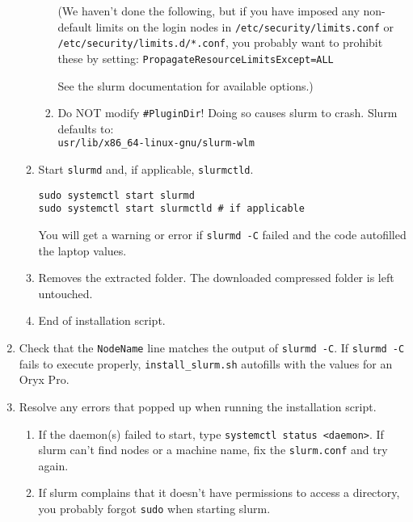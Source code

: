 \begin{enumerate}
\begin{enumerate}
\begin{enumerate}
            (We haven't done the following, but if you have imposed any non-default limits on the login nodes in \texttt{/etc/security/limits.conf} or \texttt{/etc/security/limits.d/*.conf}, you probably want to prohibit these by setting: 
            \texttt{PropagateResourceLimitsExcept=ALL}
	
            See the slurm documentation for available options.)

          \item Do NOT modify \texttt{\#PluginDir}! Doing so causes slurm to crash. Slurm defaults to: \\
            \texttt{usr/lib/x86\_64-linux-gnu/slurm-wlm}
        \end{enumerate} 

      \item Start \texttt{slurmd} and, if applicable, \texttt{slurmctld}.

        \texttt{sudo systemctl start slurmd} \\
        \texttt{sudo systemctl start slurmctld \quad \# if applicable}

        You will get a warning or error if \texttt{slurmd -C} failed and the code autofilled the laptop values.

      \item Removes the extracted folder. The downloaded compressed folder is left untouched.
	
      \item End of installation script.
    \end{enumerate}
	
  \item Check that the \texttt{NodeName} line matches the output of \texttt{slurmd -C}. If \texttt{slurmd -C} fails to execute properly, \texttt{install\_slurm.sh} autofills with the values for an Oryx Pro.

  \item Resolve any errors that popped up when running the installation script.

    \begin{enumerate}
      \item If the daemon(s) failed to start, type \texttt{systemctl status <daemon>}. If slurm can't find nodes or a machine name, fix the \texttt{slurm.conf} and try again. 

      \item If slurm complains that it doesn't have permissions to access a directory, you probably forgot \texttt{sudo} when starting slurm.


\end{enumerate}
\end{enumerate}
